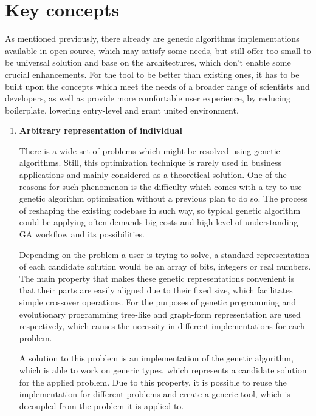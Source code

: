 \section{Key concepts}

As mentioned previously, there already are genetic algorithms implementations available in open-source, which may satisfy some needs, but still offer too small to be universal solution and base on the architectures, which don't enable some crucial enhancements. For the tool to be better than existing ones, it has to be built upon the concepts which meet the needs of a broader range of scientists and developers, as well as provide more comfortable user experience, by reducing boilerplate, lowering entry-level and grant united environment.

\begin{enumerate} 
\item
\textbf{Arbitrary representation of individual}

There is a wide set of problems which might be resolved using genetic algorithms. Still, this optimization technique is rarely used in business applications and mainly considered as a theoretical solution. One of the reasons for such phenomenon is the difficulty which comes with a try to use genetic algorithm optimization without a previous plan to do so. The process of reshaping the existing codebase in such way, so typical genetic algorithm could be applying often demands big costs and high level of understanding GA workflow and its possibilities.

Depending on the problem a user is trying to solve, a standard representation of each candidate solution would be an array of bits, integers or real numbers. The main property that makes these genetic representations convenient is that their parts are easily aligned due to their fixed size, which facilitates simple crossover operations. For the purposes of genetic programming and evolutionary programming tree-like and graph-form representation are used respectively, which causes the necessity in different implementations for each problem.

A solution to this problem is an implementation of the genetic algorithm, which is able to work on generic types, which represents a candidate solution for the applied problem. Due to this property, it is possible to reuse the implementation for different problems and create a generic tool, which is decoupled from the problem it is applied to.
\\


\end{enumerate}
